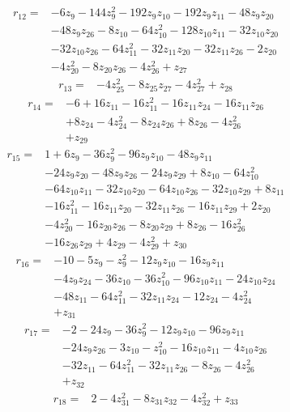 \begin{align*}
r_{12}={}&-6z_{9} -144z_{9}^{2} -192z_{9}z_{10} -192z_{9}z_{11} -48z_{9}z_{20}\\
&-48z_{9}z_{26} -8z_{10} -64z_{10}^{2} -128z_{10}z_{11} -32z_{10}z_{20}\\
&-32z_{10}z_{26} -64z_{11}^{2} -32z_{11}z_{20} -32z_{11}z_{26} -2z_{20}\\
&-4z_{20}^{2} -8z_{20}z_{26} -4z_{26}^{2} +z_{27}
\end{align*}
\begin{align*}
r_{13}={}&-4z_{25}^{2} -8z_{25}z_{27} -4z_{27}^{2} +z_{28}
\end{align*}
\begin{align*}
r_{14}={}&-6 +16z_{11} -16z_{11}^{2} -16z_{11}z_{24} -16z_{11}z_{26}\\
&+8z_{24} -4z_{24}^{2} -8z_{24}z_{26} +8z_{26} -4z_{26}^{2}\\
&+z_{29}
\end{align*}
\begin{align*}
r_{15}={}&1 +6z_{9} -36z_{9}^{2} -96z_{9}z_{10} -48z_{9}z_{11}\\
&-24z_{9}z_{20} -48z_{9}z_{26} -24z_{9}z_{29} +8z_{10} -64z_{10}^{2}\\
&-64z_{10}z_{11} -32z_{10}z_{20} -64z_{10}z_{26} -32z_{10}z_{29} +8z_{11}\\
&-16z_{11}^{2} -16z_{11}z_{20} -32z_{11}z_{26} -16z_{11}z_{29} +2z_{20}\\
&-4z_{20}^{2} -16z_{20}z_{26} -8z_{20}z_{29} +8z_{26} -16z_{26}^{2}\\
&-16z_{26}z_{29} +4z_{29} -4z_{29}^{2} +z_{30}
\end{align*}
\begin{align*}
r_{16}={}&-10 -5z_{9} -z_{9}^{2} -12z_{9}z_{10} -16z_{9}z_{11}\\
&-4z_{9}z_{24} -36z_{10} -36z_{10}^{2} -96z_{10}z_{11} -24z_{10}z_{24}\\
&-48z_{11} -64z_{11}^{2} -32z_{11}z_{24} -12z_{24} -4z_{24}^{2}\\
&+z_{31}
\end{align*}
\begin{align*}
r_{17}={}&-2 -24z_{9} -36z_{9}^{2} -12z_{9}z_{10} -96z_{9}z_{11}\\
&-24z_{9}z_{26} -3z_{10} -z_{10}^{2} -16z_{10}z_{11} -4z_{10}z_{26}\\
&-32z_{11} -64z_{11}^{2} -32z_{11}z_{26} -8z_{26} -4z_{26}^{2}\\
&+z_{32}
\end{align*}
\begin{align*}
r_{18}={}&2 -4z_{31}^{2} -8z_{31}z_{32} -4z_{32}^{2} +z_{33}
\end{align*}
